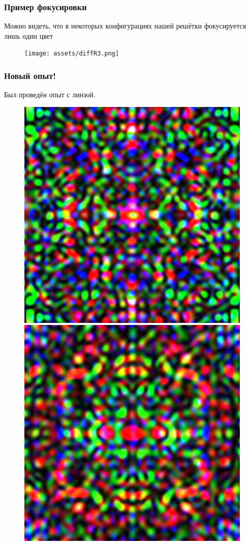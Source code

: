 \documentclass{beamer}
\begin{document}
\begin{frame}
  \frametitle{Пример фокусировки}
  Можно видеть, что в некоторых конфигурациях нашей решётки фокусируется лишь один цвет

  \begin{figure}[c]
    \texttt{[image: assets/diffR3.png]}
  \end{figure}
\end{frame}

\begin{frame}
  \frametitle{Новый опыт!}

  Был проведён опыт с линзой. 
  \begin{figure}[c]
    \includegraphics[scale=0.3]{assets/len1.png}
    \includegraphics[scale=0.3]{assets/len2.png}
  \end{figure}
\end{frame}
\end{document}
